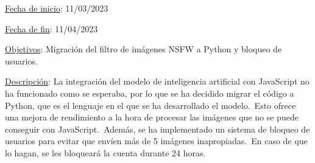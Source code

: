 
\underline{Fecha de inicio}: 11/03/2023

\underline{Fecha de fin}: 11/04/2023

\underline{Objetivos}:
Migración del filtro de imágenes NSFW a Python y bloqueo de usuarios.

\underline{Descripción}:
La integración del modelo de inteligencia artificial con JavaScript no ha funcionado como se esperaba, por lo que se
ha decidido migrar el código a Python, que es el lenguaje en el que se ha desarrollado el modelo.\ Esto ofrece
una mejora de rendimiento a la hora de procesar las imágenes que no se puede conseguir con JavaScript.\ Además, se
ha implementado un sistema de bloqueo de usuarios para evitar que envíen más de 5 imágenes inapropiadas.\ En caso de
que lo hagan, se les bloqueará la cuenta durante 24 horas.


